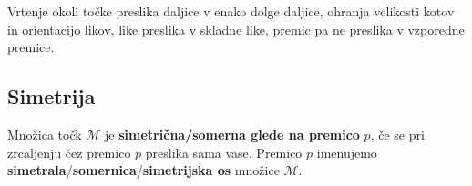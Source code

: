 \begin{figure}[H]
                \end{figure}

                
            
                Vrtenje okoli točke preslika daljice v enako dolge daljice, ohranja velikosti kotov in orientacijo likov, like preslika v skladne like, premic pa ne preslika v vzporedne premice.


        



        
        \subsection*{Simetrija}

                Množica točk $\mathcal{M}$ je \textbf{simetrična/somerna glede na premico} $p$, 
                če se pri zrcaljenju čez premico $p$ preslika sama vase. 
                Premico $p$ imenujemo \textbf{simetrala}/\textbf{somernica}/\textbf{simetrijska os} množice $\mathcal{M}$. 
                 ~\\      

